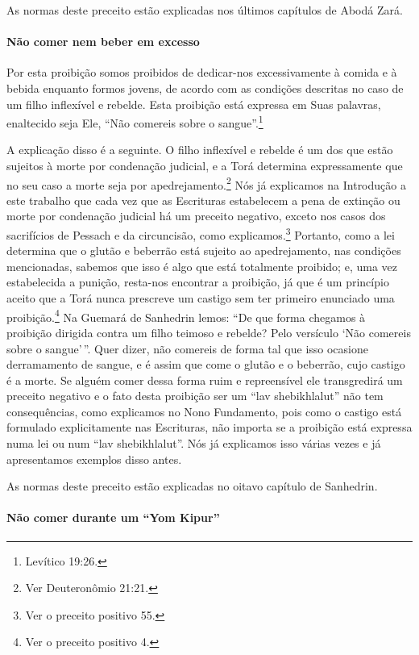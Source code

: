 As normas deste preceito estão explicadas nos últimos capítulos de Abodá Zará.

\paragraph{Não comer nem beber em excesso}

Por esta proibição somos proibidos de dedicar-nos excessivamente à
comida e à bebida enquanto formos jovens, de acordo com as condições
descritas no caso de um filho inflexível e rebelde. Esta proibição está
expressa em Suas palavras, enaltecido seja Ele, ``Não comereis sobre o
sangue''.\footnote{Levítico 19:26.}

A explicação disso é a seguinte. O filho inflexível e rebelde é um dos
que estão sujeitos à morte por condenação judicial, e a Torá determina
expressamente que no seu caso a morte seja por
apedrejamento.\footnote{Ver Deuteronômio 21:21.} Nós já explicamos na Introdução a
este trabalho que cada vez que as Escrituras estabelecem a pena de
extinção ou morte por condenação judicial há um preceito negativo,
exceto nos casos dos sacrifícios de Pessach e da circuncisão, como
explicamos.\footnote{Ver o preceito positivo 55.} Portanto, como a lei determina que o
glutão e beberrão está sujeito ao apedrejamento, nas condições
mencionadas, sabemos que isso é algo que está totalmente proibido; e,
uma vez estabelecida a punição, resta-nos encontrar a proibição, já que
é um princípio aceito que a Torá nunca prescreve um castigo sem ter
primeiro enunciado uma proibição.\footnote{Ver o preceito positivo 4.} Na Guemará de
Sanhedrin lemos: ``De que forma chegamos à proibição dirigida contra um
filho teimoso e rebelde? Pelo versículo `Não comereis sobre o sangue'\,''.
Quer dizer, não comereis de forma tal que isso ocasione derramamento de
sangue, e é assim que come o glutão e o beberrão, cujo castigo é a
morte. Se alguém comer dessa forma ruim e repreensível ele transgredirá
um preceito negativo e o fato desta proibição ser um ``lav
shebikhlalut'' não tem consequências, como explicamos no Nono
Fundamento, pois como o castigo está formulado explicitamente nas
Escrituras, não importa se a proibição está expressa numa lei ou num
``lav shebikhlalut''. Nós já explicamos isso várias vezes e já
apresentamos exemplos disso antes.

As normas deste preceito estão explicadas no oitavo capítulo de Sanhedrin.

\paragraph{Não comer durante um ``Yom Kipur''}

